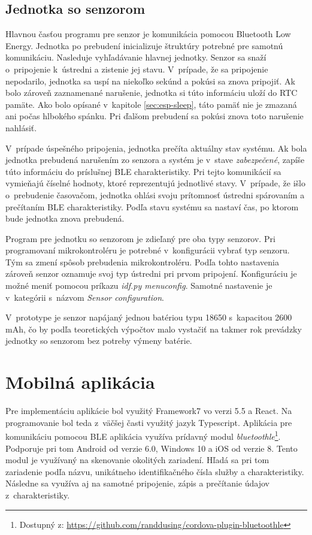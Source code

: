 \subsection{Jednotka so senzorom}

Hlavnou časťou programu pre senzor je komunikácia pomocou Bluetooth Low Energy. Jednotka po prebudení inicializuje štruktúry potrebné pre samotnú komunikáciu. Nasleduje vyhľadávanie hlavnej jednotky. Senzor sa snaží o~pripojenie k~ústredni a zistenie jej stavu. V~prípade, že sa pripojenie nepodarilo, jednotka sa uspí na niekoľko sekúnd a pokúsi sa znova pripojiť. Ak bolo zároveň zaznamenané narušenie, jednotka si túto informáciu uloží do RTC pamäte. Ako bolo opísané v~kapitole \ref{sec:esp-sleep}, táto pamäť nie je zmazaná ani počas hlbokého spánku. Pri ďalšom prebudení sa pokúsi znova toto narušenie nahlásiť.

V~prípade úspešného pripojenia, jednotka prečíta aktuálny stav systému. Ak bola jednotka prebudená narušením zo senzora a systém je v~stave \textit{zabezpečené}, zapíše túto informáciu do príslušnej BLE charakteristiky. Pri tejto komunikácií sa vymieňajú číselné hodnoty, ktoré reprezentujú jednotlivé stavy. V~prípade, že išlo o~prebudenie časovačom, jednotka ohlási svoju prítomnosť ústredni spárovaním a prečítaním BLE charakteristiky. Podľa stavu systému sa nastaví čas, po ktorom bude jednotka znova prebudená.

Program pre jednotku so senzorom je zdieľaný pre oba typy senzorov. Pri programovaní mikrokontroléru je potrebné v~konfigurácii vybrať typ senzoru. Tým sa zmení spôsob prebudenia mikrokontroléru. Podľa tohto nastavenia zároveň senzor oznamuje svoj typ ústredni pri prvom pripojení. Konfiguráciu je možné meniť pomocou príkazu \textit{idf.py menuconfig}. Samotné nastavenie je v~kategórii s~názvom \textit{Sensor configuration}.

V~prototype je senzor napájaný jednou batériou typu 18650 s~kapacitou 2600 mAh, čo by podľa teoretických výpočtov malo vystačiť na takmer rok prevádzky jednotky so senzorom bez potreby výmeny batérie.

\section{Mobilná aplikácia}

Pre implementáciu aplikácie bol využitý Framework7 vo verzi 5.5 a React. Na programovanie bol teda z~väčšej časti využitý jazyk Typescript. Aplikácia pre komunikáciu pomocou BLE aplikácia využíva prídavný modul \textit{bluetoothle}\footnote{Dostupný z: \url{https://github.com/randdusing/cordova-plugin-bluetoothle}}. Podporuje pri tom Android od verzie 6.0, Windows 10 a iOS od verzie 8. Tento modul je využívaný na skenovanie okolitých zariadení. Hľadá sa pri tom zariadenie podľa názvu, unikátneho identifikačného čísla služby a charakteristiky. Následne sa využíva aj na samotné pripojenie, zápis a prečítanie údajov z~charakteristiky.

